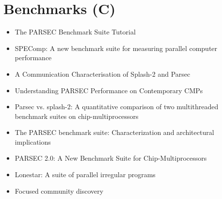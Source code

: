 \section{Benchmarks (C)}
\label{sec:lr-benchmarks-c}

\begin{itemize}
\item The PARSEC Benchmark Suite Tutorial \cite{Bienia2009}
\item SPEComp: A new benchmark suite for measuring parallel computer
  performance \cite{Aslot}
\item A Communication Characterisation of Splash-2 and Parsec
  \cite{Barrow-Williams2009}
\item Understanding PARSEC Performance on Contemporary CMPs
  \cite{Bhadauria2009}
\item Parsec vs. splash-2: A quantitative comparison of two
  multithreaded benchmark suites on chip-multiprocessors
  \cite{Bienia2008}
\item The PARSEC benchmark suite: Characterization and architectural
  implications \cite{Bienia2008a}
\item PARSEC 2.0: A New Benchmark Suite for Chip-Multiprocessors
  \cite{Bienia2009a}
\item Lonestar: A suite of parallel irregular programs
  \cite{Kulkarni2009}
\item Focused community discovery \cite{Hildrum2005}
\end{itemize}


